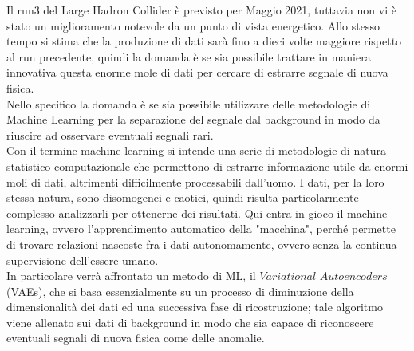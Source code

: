 Il run3 del Large Hadron Collider è previsto per Maggio 2021, tuttavia non vi è stato un miglioramento notevole da un punto di vista energetico. Allo stesso tempo si stima che la produzione di dati sarà fino a dieci volte maggiore rispetto al run precedente, quindi la domanda è se sia possibile trattare in maniera innovativa questa enorme mole di dati per cercare di estrarre segnale di nuova fisica. \\
Nello specifico la domanda è se sia possibile utilizzare delle metodologie di Machine Learning per la separazione del segnale dal background in modo da riuscire ad osservare eventuali segnali rari.\\
Con il termine machine learning si intende una serie di metodologie di natura statistico-computazionale che permettono di estrarre informazione utile da enormi moli di dati, altrimenti difficilmente processabili dall'uomo.
I dati, per la loro stessa natura, sono disomogenei e caotici, quindi risulta particolarmente complesso analizzarli per ottenerne dei risultati. Qui entra in gioco il machine learning, ovvero l'apprendimento automatico della "macchina", perché permette di trovare relazioni nascoste fra i dati autonomamente, ovvero senza la continua supervisione dell'essere umano. \\
In particolare verrà affrontato un metodo di ML, il $\textit{Variational Autoencoders}$ (VAEs), che si basa essenzialmente su un processo di diminuzione della dimensionalità dei dati ed una successiva fase di ricostruzione; tale algoritmo viene allenato sui dati di background in modo che sia capace di riconoscere eventuali segnali di nuova fisica come delle anomalie.\\


